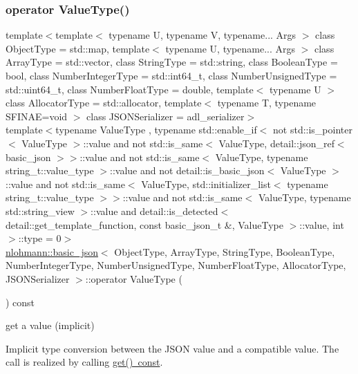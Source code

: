 \subsubsection{\texorpdfstring{operator Value\+Type()}{operator ValueType()}}
{\footnotesize\ttfamily template$<$template$<$ typename U, typename V, typename... Args $>$ class Object\+Type = std\+::map, template$<$ typename U, typename... Args $>$ class Array\+Type = std\+::vector, class String\+Type  = std\+::string, class Boolean\+Type  = bool, class Number\+Integer\+Type  = std\+::int64\+\_\+t, class Number\+Unsigned\+Type  = std\+::uint64\+\_\+t, class Number\+Float\+Type  = double, template$<$ typename U $>$ class Allocator\+Type = std\+::allocator, template$<$ typename T, typename S\+F\+I\+N\+A\+E=void $>$ class J\+S\+O\+N\+Serializer = adl\+\_\+serializer$>$ \\
template$<$typename Value\+Type , typename std\+::enable\+\_\+if$<$ not std\+::is\+\_\+pointer$<$ Value\+Type $>$\+::value and not std\+::is\+\_\+same$<$ Value\+Type, detail\+::json\+\_\+ref$<$ basic\+\_\+json $>$$>$\+::value and not std\+::is\+\_\+same$<$ Value\+Type, typename string\+\_\+t\+::value\+\_\+type $>$\+::value and not detail\+::is\+\_\+basic\+\_\+json$<$ Value\+Type $>$\+::value and not std\+::is\+\_\+same$<$ Value\+Type, std\+::initializer\+\_\+list$<$ typename string\+\_\+t\+::value\+\_\+type $>$$>$\+::value and not std\+::is\+\_\+same$<$ Value\+Type, typename std\+::string\+\_\+view $>$\+::value and detail\+::is\+\_\+detected$<$ detail\+::get\+\_\+template\+\_\+function, const basic\+\_\+json\+\_\+t \&, Value\+Type $>$\+::value, int $>$\+::type  = 0$>$ \\
\mbox{\hyperlink{classnlohmann_1_1basic__json}{nlohmann\+::basic\+\_\+json}}$<$ Object\+Type, Array\+Type, String\+Type, Boolean\+Type, Number\+Integer\+Type, Number\+Unsigned\+Type, Number\+Float\+Type, Allocator\+Type, J\+S\+O\+N\+Serializer $>$\+::operator Value\+Type (\begin{DoxyParamCaption}{ }\end{DoxyParamCaption}) const\hspace{0.3cm}{\ttfamily [inline]}}



get a value (implicit) 

Implicit type conversion between the J\+S\+ON value and a compatible value. The call is realized by calling \mbox{\hyperlink{classnlohmann_1_1basic__json_a6b187a22994c12c8cae0dd5ee99dc85e}{get() const}}.


